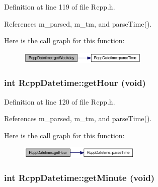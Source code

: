 Definition at line 119 of file Rcpp.h.

References m\_\-parsed, m\_\-tm, and parseTime().

Here is the call graph for this function:\nopagebreak
\begin{figure}[H]
\begin{center}
\leavevmode
\includegraphics[width=174pt]{classRcppDatetime_796802561fa8bb87a8e2a1836afaaa58_cgraph}
\end{center}
\end{figure}
\hypertarget{classRcppDatetime_0da8db1ecd235a6e7ab309e70e4e93b0}{
\subsubsection[getHour]{\setlength{\rightskip}{0pt plus 5cm}int RcppDatetime::getHour (void)}}
\label{classRcppDatetime_0da8db1ecd235a6e7ab309e70e4e93b0}




Definition at line 120 of file Rcpp.h.

References m\_\-parsed, m\_\-tm, and parseTime().

Here is the call graph for this function:\nopagebreak
\begin{figure}[H]
\begin{center}
\leavevmode
\includegraphics[width=164pt]{classRcppDatetime_0da8db1ecd235a6e7ab309e70e4e93b0_cgraph}
\end{center}
\end{figure}
\hypertarget{classRcppDatetime_db41bd524ead66d69e129b1f2767358a}{
\subsubsection[getMinute]{\setlength{\rightskip}{0pt plus 5cm}int RcppDatetime::getMinute (void)}}
\label{classRcppDatetime_db41bd524ead66d69e129b1f2767358a}




